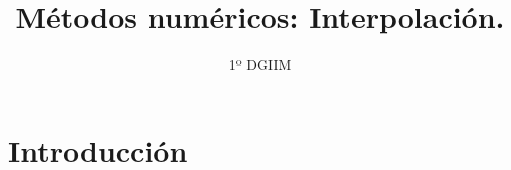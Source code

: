 \documentclass{article}
\title{\LARGE{\textbf{Métodos numéricos: Interpolación.}}}
\author{1º DGIIM}
\date{}
\begin{document}
\maketitle

\hrulefill

\section{Introducción}
\end{document}
